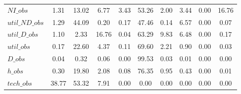 \begin{center}
\begin{longtable}{lccccccccc}
$NI\_obs        $	 & 	         1.31	 & 	        13.02	 & 	         6.77	 & 	         3.43	 & 	        53.26	 & 	         2.00	 & 	         3.44	 & 	         0.00	 & 	        16.76 \\ 
$util\_ND\_obs  $	 & 	         1.29	 & 	        44.09	 & 	         0.20	 & 	         0.17	 & 	        47.46	 & 	         0.14	 & 	         6.57	 & 	         0.00	 & 	         0.07 \\ 
$util\_D\_obs   $	 & 	         1.10	 & 	         2.33	 & 	        16.76	 & 	         0.04	 & 	        63.29	 & 	         9.83	 & 	         6.48	 & 	         0.00	 & 	         0.17 \\ 
$util\_obs      $	 & 	         0.17	 & 	        22.60	 & 	         4.37	 & 	         0.11	 & 	        69.60	 & 	         2.21	 & 	         0.90	 & 	         0.00	 & 	         0.03 \\ 
$D\_obs         $	 & 	         0.04	 & 	         0.32	 & 	         0.06	 & 	         0.00	 & 	        99.53	 & 	         0.03	 & 	         0.01	 & 	         0.00	 & 	         0.00 \\ 
$h\_obs         $	 & 	         0.30	 & 	        19.80	 & 	         2.08	 & 	         0.08	 & 	        76.35	 & 	         0.95	 & 	         0.43	 & 	         0.00	 & 	         0.01 \\ 
$tech\_obs      $	 & 	        38.77	 & 	        53.32	 & 	         7.91	 & 	         0.00	 & 	         0.00	 & 	         0.00	 & 	         0.00	 & 	         0.00	 & 	         0.00 \\ 
\end{longtable}
 \end{center}
